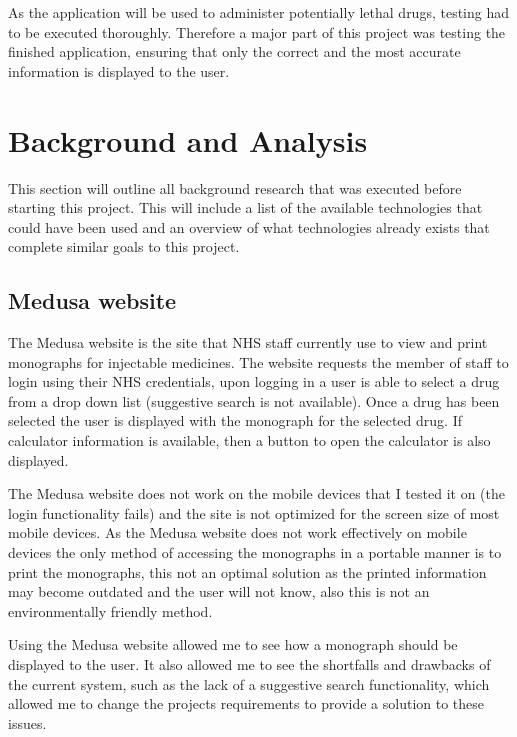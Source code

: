 As the application will be used to administer potentially lethal drugs, testing had to be executed thoroughly. Therefore a major part of this project was testing the finished application, ensuring that only the correct and the most accurate information is displayed to the user.


\section{Background and Analysis}

This section will outline all background research that was executed before starting this project. This will include a list of the available technologies that could have been used and an overview of what technologies already exists that complete similar goals to this project.

\subsection{Medusa website}

The Medusa \cite{medusa} website is the site that NHS staff currently use to view and print monographs for injectable medicines. The website requests the member of staff to login using their NHS credentials, upon logging in a user is able to select a drug from a drop down list (suggestive search is not available). Once a drug has been selected the user is displayed with the monograph \cite{monograph} for the selected drug. If calculator information is available, then a button to open the calculator is also displayed.

The Medusa website \cite{medusa} does not work on the mobile devices that I tested it on (the login functionality fails) and the site is not optimized for the screen size of most mobile devices. As the Medusa website \cite{medusa} does not work effectively on mobile devices the only method of accessing the monographs \cite{monograph} in a portable manner is to print the monographs, this not an optimal solution as the printed information may become outdated and the user will not know, also this is not an environmentally friendly method.

Using the Medusa website \cite{medusa} allowed me to see how a monograph \cite{monograph} should be displayed to the user. It also allowed me to see the shortfalls and drawbacks of the current system, such as the lack of a suggestive search functionality, which allowed me to change the projects requirements to provide a solution to these issues.

